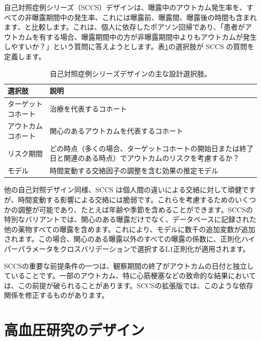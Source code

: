 \documentclass[
  11pt]{book}
\theoremstyle{definition}
\theoremstyle{definition}
\theoremstyle{definition}
\theoremstyle{definition}
\theoremstyle{remark}
\begin{document}
自己対照症例シリーズ（SCCS）デザイン\citep[ ]{farrington_1995, whitaker_2006}は、曝露中のアウトカム発生率を、すべての非曝露期間中の発生率、これには曝露前、曝露間、曝露後の時間も含まれます、と比較します。これは、個人に依存したポアソン回帰であり、「患者がアウトカムを有する場合、曝露期間中の方が非曝露期間中よりもアウトカムが発生しやすいか？」という質問に答えようとします。表\ref{tab:sccsChoices}の選択肢が SCCS の質問を定義します。  

\begin{table}
\centering
\caption{\label{tab:sccsChoices}自己対照症例シリーズデザインの主な設計選択肢。}
\centering
\begin{tabular}[t]{l>{\raggedright\arraybackslash}p{9cm}}
\toprule
選択肢 & 説明\\
\midrule
ターゲットコホート & 治療を代表するコホート\\
アウトカムコホート & 関心のあるアウトカムを代表するコホート\\
リスク期間 & どの時点（多くの場合、ターゲットコホートの開始日または終了日と関連のある時点）でアウトカムのリスクを考慮するか？\\
モデル & 時間変動する交絡因子の調整を含む効果の推定モデル\\
\bottomrule
\end{tabular}
\end{table}

他の自己対照デザイン同様、SCCS は個人間の違いによる交絡に対して頑健ですが、時間変動する影響による交絡には脆弱です。これらを考慮するためのいくつかの調整が可能であり、たとえば年齢や季節を含めることができます。SCCSの特別なバリアントでは、関心のある曝露だけでなく、データベースに記録された他の薬物すべての曝露を含めます\citep[ ]{simpson_2013}。これにより、モデルに数千の追加変数が追加されます。この場合、関心のある曝露以外のすべての曝露の係数に、正則化ハイパーパラメータをクロスバリデーションで選択するL1正則化が適用されます。

SCCSの重要な前提条件の一つは、観察期間の終了がアウトカムの日付と独立していることです。一部のアウトカム、特に心筋梗塞などの致命的な結果においては、この前提が破られることがあります。SCCSの拡張版では、このような依存関係を修正するものがあります\citep[ ]{farrington_2011}。

\section{高血圧研究のデザイン}\label{ux9ad8ux8840ux5727ux7814ux7a76ux306eux30c7ux30b6ux30a4ux30f3}
\end{document}
